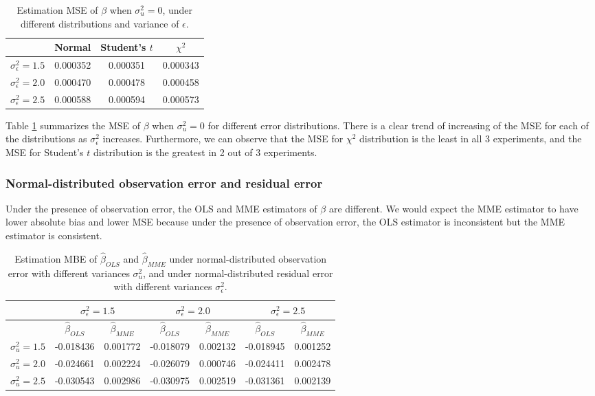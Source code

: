 \documentclass{article}
\begin{document}
\begin{table}[ht]
    \centering
    \caption{Estimation MSE of $\beta$ when $\sigma^2_u=0$, under different distributions and variance of $\epsilon$.}
    \label{Tab:MSE_absence}
    \begin{tabular}[t]{lccc}
        \hline
        &Normal&Student's $t$&$\chi^2$\\
        \hline
        $\sigma^2_\epsilon = 1.5$&0.000352&0.000351&0.000343\\
        $\sigma^2_\epsilon = 2.0$&0.000470&0.000478&0.000458\\
        $\sigma^2_\epsilon = 2.5$&0.000588&0.000594&0.000573\\
        \hline
    \end{tabular}
\end{table}

Table \ref{Tab:MSE_absence} summarizes the MSE of $\beta$ when $\sigma^2_u=0$ for different error distributions.
There is a clear trend of increasing of the MSE for each of the distributions as $\sigma^2_\epsilon$ increases. 
Furthermore, we can observe that the MSE for $\chi^2$ distribution is the least in all 3 experiments, and the MSE for Student's $t$ distribution is the greatest in 2 out of 3 experiments.

\subsubsection{Normal-distributed observation error and residual error}

Under the presence of observation error, the OLS and MME estimators of $\beta$ are different.
We would expect the MME estimator to have lower absolute bias and lower MSE because under the presence of observation error, the OLS estimator is inconsistent but the MME estimator is consistent.

\begin{table}[ht]
    \centering
    \caption{Estimation MBE of $\hat{\beta}_{OLS}$ and $\hat{\beta}_{MME}$ under normal-distributed observation error with different variances $\sigma^2_u$, and under normal-distributed residual error with different variances $\sigma^2_\epsilon$.}
    \label{Tab:MBE_absence}
    \begin{tabular}[t]{lcccccc}
        \hline
        &\multicolumn{2}{c}{$\sigma^2_\epsilon=1.5$}&\multicolumn{2}{c}{$\sigma^2_\epsilon=2.0$}&\multicolumn{2}{c}{$\sigma^2_\epsilon=2.5$}\\
        \hline
        &$\hat{\beta}_{OLS}$&$\hat{\beta}_{MME}$&$\hat{\beta}_{OLS}$&$\hat{\beta}_{MME}$&$\hat{\beta}_{OLS}$&$\hat{\beta}_{MME}$\\
        \hline
        $\sigma^2_u = 1.5$&-0.018436& 0.001772&-0.018079&0.002132&-0.018945&0.001252\\
        $\sigma^2_u = 2.0$&-0.024661& 0.002224&-0.026079&0.000746&-0.024411&0.002478\\
        $\sigma^2_u = 2.5$&-0.030543& 0.002986&-0.030975&0.002519&-0.031361&0.002139\\
        \hline
    \end{tabular}
\end{table}
\end{document}
